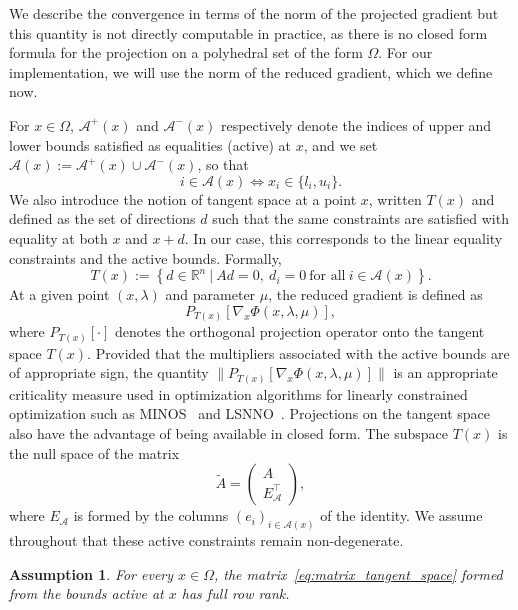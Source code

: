 \documentclass{article}
\numberwithin{equation}{section}
\newcommand{\RR}{{\mathbb{R}}} %
\newcommand{\calA}{{\mathcal{A}}}
\newcommand{\proj}[2]{P_{#1} \left[ {#2} \right]} %
\theoremstyle{plain}
\newtheorem{assumption}{Assumption}
\begin{document}
	We describe the convergence in terms of the norm of the projected gradient but this quantity is not directly computable in practice, as there is no closed form formula for the projection on a polyhedral set of the form $\Omega$. For our implementation, we will use the norm of the reduced gradient, which we define now. 
	
	For $x \in \Omega$, $\calA^+(x)$ and $\calA^-(x)$ respectively denote the indices of upper and lower bounds satisfied as equalities (active) at $x$, and we set $\calA(x) := \calA^+(x) \cup \calA^-(x)$, so that
	\begin{equation*}
		i \in \calA(x) \iff x_i \in \{l_i,u_i\}.
	\end{equation*}
	We also introduce the notion of tangent space at a point $x$, written $T(x)$ and defined as the set of directions $d$ such that the same constraints are satisfied with equality at both $x$ and $x+d$. In our case, this corresponds to the linear equality constraints and the active bounds. Formally,
	\begin{equation}\label{eq:tangent_space}
		T(x) := \left\{ d \in \RR^n \ | \ Ad = 0,\ d_i=0\ \text{for all}\ i\in \calA(x)\right\}.
	\end{equation}
	At a given point \((x,\lambda)\) and parameter $\mu$, the reduced gradient is defined as
	\begin{equation*}
		\proj{T(x)}{\nabla_x \Phi(x,\lambda,\mu)},
	\end{equation*}
	where $\proj{T(x)}{\cdot}$ denotes the orthogonal projection operator onto the tangent space $T(x)$.
	Provided that the multipliers associated with the active bounds are of appropriate sign, the quantity $\|\proj{T(x)}{\nabla_x \Phi(x,\lambda,\mu)}\|$ is an appropriate criticality measure used in optimization algorithms for linearly constrained optimization such as MINOS~\cite{murtaghsaunders:1978} and LSNNO~\cite{tointtuyttens:1992}.
	Projections on the tangent space also have the advantage of being available in closed form. The subspace $T(x)$ is the null space of the matrix
	\begin{equation}\label{eq:matrix_tangent_space}
		\tilde{A} = \begin{pmatrix}
			A \\ E_\calA^\top
		\end{pmatrix},
	\end{equation}
	where $E_\calA$ is formed by the columns $(e_i)_{i \in \calA(x)}$ of the identity. We assume throughout that these active constraints remain non-degenerate.
	\begin{assumption}\label{assumption:full_rank_active}
		For every $x \in \Omega$, the matrix~\eqref{eq:matrix_tangent_space} formed from the bounds active at $x$ has full row rank.
	\end{assumption}
\end{document}
